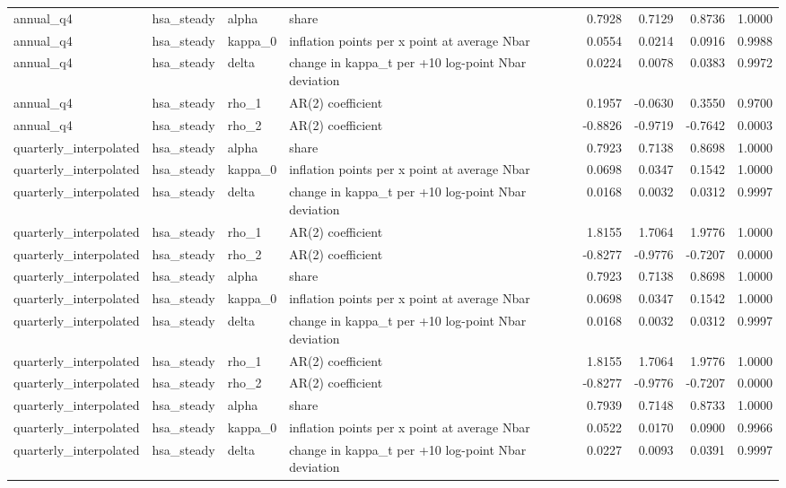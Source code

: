 \begin{tabular}{llllrrrr}
annual\_q4 & hsa\_steady & alpha & share & 0.7928 & 0.7129 & 0.8736 & 1.0000 \\
annual\_q4 & hsa\_steady & kappa\_0 & inflation points per x point at average Nbar & 0.0554 & 0.0214 & 0.0916 & 0.9988 \\
annual\_q4 & hsa\_steady & delta & change in kappa\_t per +10 log-point Nbar deviation & 0.0224 & 0.0078 & 0.0383 & 0.9972 \\
annual\_q4 & hsa\_steady & rho\_1 & AR(2) coefficient & 0.1957 & -0.0630 & 0.3550 & 0.9700 \\
annual\_q4 & hsa\_steady & rho\_2 & AR(2) coefficient & -0.8826 & -0.9719 & -0.7642 & 0.0003 \\
quarterly\_interpolated & hsa\_steady & alpha & share & 0.7923 & 0.7138 & 0.8698 & 1.0000 \\
quarterly\_interpolated & hsa\_steady & kappa\_0 & inflation points per x point at average Nbar & 0.0698 & 0.0347 & 0.1542 & 1.0000 \\
quarterly\_interpolated & hsa\_steady & delta & change in kappa\_t per +10 log-point Nbar deviation & 0.0168 & 0.0032 & 0.0312 & 0.9997 \\
quarterly\_interpolated & hsa\_steady & rho\_1 & AR(2) coefficient & 1.8155 & 1.7064 & 1.9776 & 1.0000 \\
quarterly\_interpolated & hsa\_steady & rho\_2 & AR(2) coefficient & -0.8277 & -0.9776 & -0.7207 & 0.0000 \\
quarterly\_interpolated & hsa\_steady & alpha & share & 0.7923 & 0.7138 & 0.8698 & 1.0000 \\
quarterly\_interpolated & hsa\_steady & kappa\_0 & inflation points per x point at average Nbar & 0.0698 & 0.0347 & 0.1542 & 1.0000 \\
quarterly\_interpolated & hsa\_steady & delta & change in kappa\_t per +10 log-point Nbar deviation & 0.0168 & 0.0032 & 0.0312 & 0.9997 \\
quarterly\_interpolated & hsa\_steady & rho\_1 & AR(2) coefficient & 1.8155 & 1.7064 & 1.9776 & 1.0000 \\
quarterly\_interpolated & hsa\_steady & rho\_2 & AR(2) coefficient & -0.8277 & -0.9776 & -0.7207 & 0.0000 \\
quarterly\_interpolated & hsa\_steady & alpha & share & 0.7939 & 0.7148 & 0.8733 & 1.0000 \\
quarterly\_interpolated & hsa\_steady & kappa\_0 & inflation points per x point at average Nbar & 0.0522 & 0.0170 & 0.0900 & 0.9966 \\
quarterly\_interpolated & hsa\_steady & delta & change in kappa\_t per +10 log-point Nbar deviation & 0.0227 & 0.0093 & 0.0391 & 0.9997 \\

\end{tabular}
